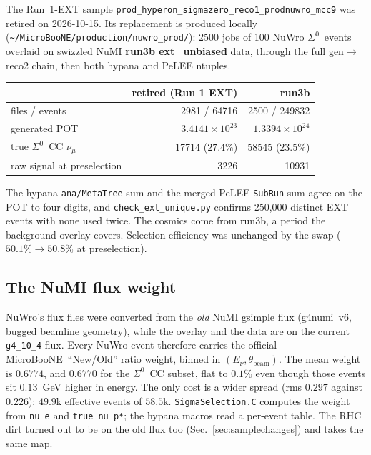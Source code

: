 \documentclass[11pt,a4paper]{article}
\newcommand{\Szero}{\ensuremath{\Sigma^{0}}}
\newcommand{\uboone}{MicroBooNE}
\newcommand{\numubar}{\ensuremath{\bar{\nu}_\mu}}
\begin{document}
The Run~1-EXT sample \texttt{prod\_hyperon\_sigmazero\_reco1\_prodnuwro\_mcc9} was
retired on 2026-10-15. Its replacement is produced locally
(\texttt{\~{}/MicroBooNE/production/nuwro\_prod/}): 2500 jobs of 100 NuWro \Szero\
events overlaid on swizzled NuMI \textbf{run3b ext\_unbiased} data, through the full
gen$\to$reco2 chain, then both hypana and PeLEE ntuples.

\begin{center}
\begin{tabular}{lrr}
\toprule
 & retired (Run 1 EXT) & run3b \\
\midrule
files / events            & 2981 / 64716 & 2500 / 249832 \\
generated POT             & $3.4141\times10^{23}$ & $1.3394\times10^{24}$ \\
true \Szero\ CC $\numubar$ & 17714 ($27.4\%$) & 58545 ($23.5\%$) \\
raw signal at preselection & 3226 & 10931 \\
\bottomrule
\end{tabular}
\end{center}

\noindent The hypana \texttt{ana/MetaTree} sum and the merged PeLEE \texttt{SubRun}
sum agree on the POT to four digits, and \texttt{check\_ext\_unique.py} confirms
250{,}000 distinct EXT events with none used twice. The cosmics come from run3b, a
period the background overlay covers. Selection efficiency was unchanged by the swap
($50.1\% \to 50.8\%$ at preselection).

\subsection{The NuMI flux weight}

NuWro's flux files were converted from the \emph{old} NuMI gsimple flux (g4numi~v6,
bugged beamline geometry), while the overlay and the data are on the current
\texttt{g4\_10\_4} flux. Every NuWro event therefore carries the official
\uboone\ ``New/Old'' ratio weight, binned in $(E_\nu, \theta_{\mathrm{beam}})$. The
mean weight is $0.6774$, and $0.6770$ for the \Szero\ CC subset, flat to $0.1\%$ even
though those events sit $0.13$~GeV higher in energy. The only cost is a wider spread
(rms $0.297$ against $0.226$): $49.9$k effective events of $58.5$k.
\texttt{SigmaSelection.C} computes the weight from \texttt{nu\_e} and
\texttt{true\_nu\_p*}; the hypana macros read a per-event table. The RHC dirt turned
out to be on the old flux too (Sec.~\ref{sec:samplechanges}) and takes the same map.
\end{document}
